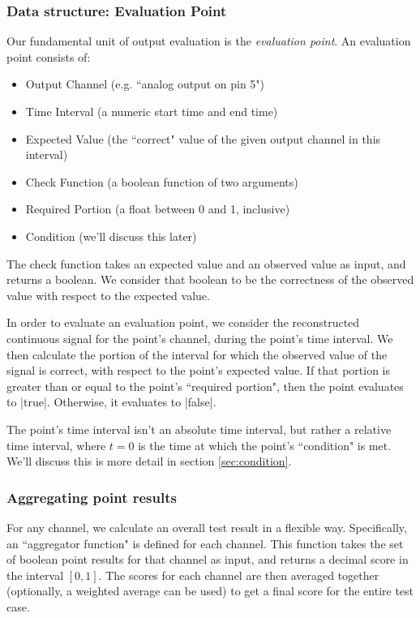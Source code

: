 \documentclass[12pt]{article}
\begin{document}
\subsubsection{Data structure: Evaluation Point}
\label{sec:eval-point}
Our fundamental unit of output evaluation is the \textit{evaluation point}.  An evaluation point consists of:

\begin{itemize}
\item Output Channel (e.g. ``analog output on pin 5")
\item Time Interval (a numeric start time and end time)
\item Expected Value (the ``correct" value of the given output channel in this interval)
\item Check Function (a boolean function of two arguments)
\item Required Portion (a float between 0 and 1, inclusive)
\item Condition (we'll discuss this later)
\end{itemize}

The check function takes an expected value and an observed value as input, and returns a boolean.  We consider that boolean to be the correctness of the observed value with respect to the expected value.

In order to evaluate an evaluation point, we consider the reconstructed continuous signal for the point's channel, during the point's time interval.  We then calculate the portion of the interval for which the observed value of the signal is correct, with respect to the point's expected value.  If that portion is greater than or equal to the point's ``required portion", then the point evaluates to |true|.  Otherwise, it evaluates to |false|.

The point's time interval isn't an absolute time interval, but rather a relative time interval, where $t=0$ is the time at which the point's ``condition" is met.  We'll discuss this is more detail in section \ref{sec:condition}.

\subsubsection{Aggregating point results}
For any channel, we calculate an overall test result in a flexible way.  Specifically, an ``aggregator function" is defined for each channel.  This function takes the set of boolean point results for that channel as input, and returns a decimal score in the interval $[0,1]$.  The scores for each channel are then averaged together (optionally, a weighted average can be used) to get a final score for the entire test case.
\end{document}
